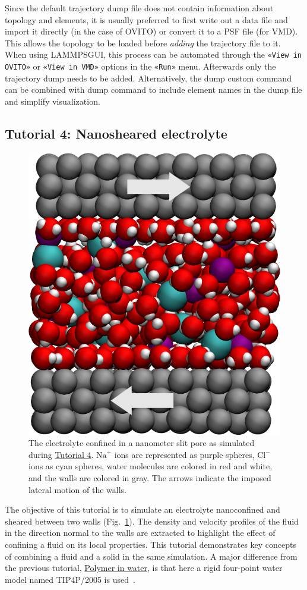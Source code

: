\documentclass[9pt,tutorial]{livecoms}
\newcommand{\lmpcmd}[1]{\colorbox{listing}{\textcolor{command}{\small{#1}}}} %
\newcommand{\guicmd}[1]{\textcolor{command}{\texttt{«#1»}}} %
\newcommand{\lammpsgui}{\textsf{LAMMPS\textendash GUI}}
\begin{document}
\begin{note}
  Since the {\color{blue}default} trajectory dump file does not contain information about
  topology and elements, it is usually preferred to first write out a
  data file and import it directly (in the case of OVITO) or convert it
  to a PSF file (for VMD).  This allows the topology to be loaded before
  \emph{adding} the trajectory file to it.  When using \lammpsgui{},
  this process can be automated through the \guicmd{View in OVITO} or
  \guicmd{View in VMD} options in the \guicmd{Run} menu.  Afterwards
  only the trajectory dump needs to be added.  {\color{blue}Alternatively, the
  \lmpcmd{dump custom} command can be combined with \lmpcmd{dump} command to
  include element names in the dump file and simplify visualization.}
\end{note}

\subsection{Tutorial 4: Nanosheared electrolyte}
\label{sheared-confined-label}

\begin{figure}
\centering
\includegraphics[width=0.55\linewidth]{NANOSHEAR}
\caption{The electrolyte confined in a nanometer slit pore as simulated during
\hyperref[sheared-confined-label]{Tutorial 4}.  $\text{Na}^+$ ions are represented
as purple spheres, $\text{Cl}^-$ ions as cyan spheres, water molecules are colored
in red and white, and the walls are colored in gray.  The arrows indicate the
imposed lateral motion of the walls.}
\label{fig:NANOSHEAR}
\end{figure}

The objective of this tutorial is to simulate an electrolyte
nanoconfined and sheared between two walls (Fig.~\ref{fig:NANOSHEAR}).  The density
and velocity profiles of the fluid in the direction normal to the walls are
extracted to highlight the effect of confining a fluid on its local properties.
This tutorial demonstrates key concepts of combining a fluid and a solid in
the same simulation.  A major difference from the previous tutorial,
\hyperref[all-atom-label]{Polymer in water}, is that here a rigid four-point
water model named TIP4P/2005 is used~\cite{abascal2005general}.
\end{document}
